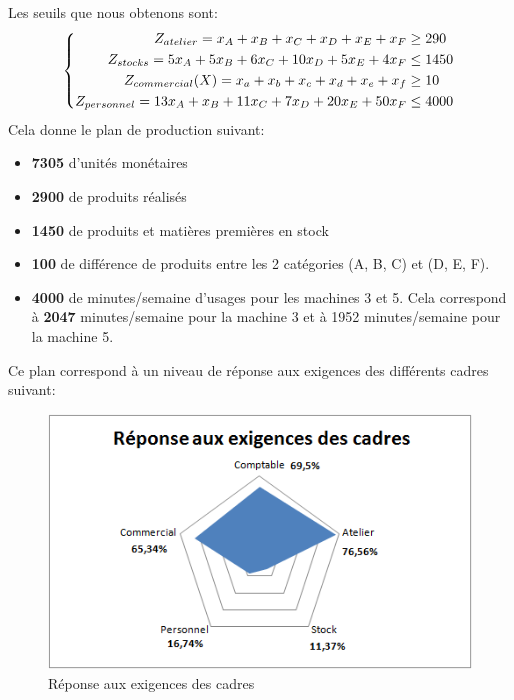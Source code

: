 \documentclass[12pt]{article}
\begin{document}
Les seuils que nous obtenons sont:
\begin{equation*}
\left\{
\begin{aligned}
   Z_{atelier}= x_{A} + x_{B} + x_{C} + x_{D} + x_{E} + x_{F} &\geq290 
    \\
   Z_{stocks}= 5x_{A} + 5x_{B} + 6x_{C} + 10x_{D} + 5x_{E} + 4x_{F}
   &\leq1450 
   \\
   Z_{commercial}(X)=x_{a} + x_{b} + x_{c} + x_{d} + x_{e} + x_{f} &\geq 10
   \\
   Z_{personnel}= 13x_{A} + x_{B} + 11x_{C} + 7x_{D} + 20x_{E} + 50x_{F}&\leq 4000
\end{aligned}
\right.
\\
\\
\end{equation*}
Cela donne le plan de production suivant:
\begin{itemize}
\item \textbf{7305} d'unités monétaires
\item  \textbf{2900} de produits réalisés
\item \textbf{1450} de produits et matières premières en stock
\item \textbf{100} de différence de produits entre les 2 catégories (A, B, C) et (D, E, F).
\item \textbf{4000} de minutes/semaine d'usages pour les machines 3 et 5. Cela correspond à \textbf{2047} minutes/semaine pour la machine 3 et à 1952 minutes/semaine pour la machine 5.
\end{itemize}
Ce plan correspond à un niveau de réponse aux exigences des différents cadres suivant:
\begin{figure}[H]
    \begin{center}
        \includegraphics[scale=0.8]{plots_partie2/plot_radar.png}
        \caption{
            \label{fig} Réponse aux exigences des cadres
        }
    \end{center}
\end{figure}
\end{document}
